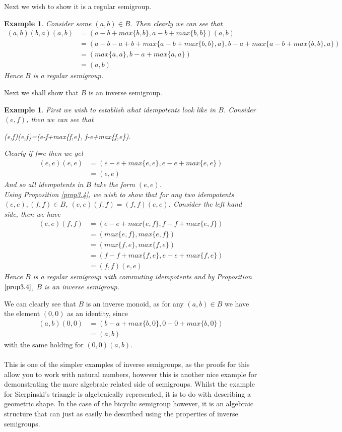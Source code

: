 \documentclass[12pt]{article}
\newtheorem{ex}[theorem]{Example}
\begin{document}
Next we wish to show it is a regular semigroup.
\begin{ex}
Consider some $(a,b)\in B$. Then clearly we can see that
	\begin{align*}
		(a,b)(b,a)(a,b) &= (a-b + max\{b,b\}, a-b + max\{b,b\})(a,b)\\
				&= (a-b-a+b + max\{a-b+max\{b,b\},a\}, b-a+max\{a-b+max\{b,b\},a\})\\
				&=(max\{a,a\},b-a+max\{a,a\})\\
				&=(a,b)
	\end{align*}
Hence $B$ is a regular semigroup.
\end{ex}
Next we shall show that $B$ is an inverse semigroup.
\begin{ex}
	First we wish to establish what idempotents look like in $B$. Consider $(e,f)$, then we can see that
	\begin{center}
		(e,f)(e,f)=(e-f+max\{f,e\}, f-e+max\{f,e\}).
	\end{center}
	Clearly if f=e then we get
	\begin{align*}
		(e,e)(e,e) &= (e-e+max\{e,e\},e-e+max\{e,e\})\\
			&= (e,e)
	\end{align*}
	And so all idempotents in $B$ take the form $(e,e)$.
	\\Using Proposition \ref{prop3.4}, we wish to show that for any two idempotents $(e,e),(f,f) \in B$, $(e,e)(f,f)=(f,f)(e,e)$. Consider the left hand side, then we have
	\begin{align*}
		(e,e)(f,f)&=(e-e+max\{e,f\},f-f+max\{e,f\})\\
			&= (max\{e,f\},max\{e,f\})\\
			&=(max\{f,e\},max\{f,e\})\\
			&=(f-f+max\{f,e\},e-e+max\{f,e\})\\
			&=(f,f)(e,e)
	\end{align*}
	Hence $B$ is a regular semigroup with commuting idempotents and by Proposition $\ref{prop3.4}$, $B$ is an inverse semigroup.
\end{ex}
\noindent We can clearly see that $B$ is an inverse monoid, as for any $(a,b) \in B$ we have the element $(0,0)$ as an identity, since
	\begin{align*}
		(a,b)(0,0) &= (b-a+max\{b,0\},0-0+max\{b,0\})\\
			&= (a,b)
	\end{align*}
with the same holding for $(0,0)(a,b)$.\\
\\This is one of the simpler examples of inverse semigroups, as the proofs for this allow you to work with natural numbers, however this is another nice example for demonstrating the more algebraic related side of semigroups. Whilst the example for Sierpinski's triangle is algebraically represented, it is to do with describing a geometric shape. In the case of the bicyclic semigroup however, it is an algebraic structure that can just as easily be described using the properties of inverse semigroups.
\end{document}
